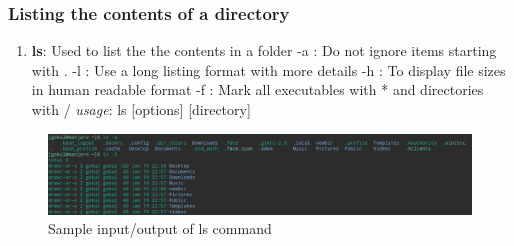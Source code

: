 \documentclass{article}
\begin{document}
\subsubsection{Listing the contents of a directory}
\begin{enumerate}
    \item {\bf ls}: Used to list the the contents in a folder\newline
    \hspace{\parindent}{\em options} 
    \newline-a : Do not ignore items starting with .
    \newline-l : Use a long listing format with more details
    \newline-h : To display file sizes in human readable format
    \newline-f : Mark all executables with * and directories with /\newline
    \hspace{\parindent} {\em usage}: ls [options] [directory] \newline
    
\end{enumerate}
    \begin{figure}[h]
        \centering
        \includegraphics[width=.80\textwidth]{img/p1/ss2.png}
        \caption{Sample input/output of ls command}
    \end{figure}
    
\end{document}
